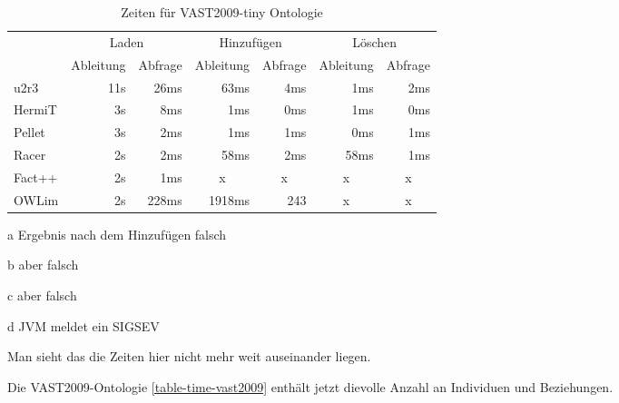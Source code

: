 \begin{table}[htbp]
\caption{Zeiten für VAST2009-tiny Ontologie}
\label{table-time-vast-tiny}
\begin{center}
\begin{threeparttable}
\begin{tabular}{l|r|r|r|r|r|r|}
\cline{2-7}
 & \multicolumn{2}{|c|}{Laden} & \multicolumn{2}{|c|}{Hinzufügen} & \multicolumn{2}{|c|}{Löschen} \\
\cline{2-7}
 & \multicolumn{1}{|c|}{Ableitung} & \multicolumn{1}{|c|}{Abfrage} & \multicolumn{1}{|c|}{Ableitung} & \multicolumn{1}{|c|}{Abfrage} & \multicolumn{1}{|c|}{Ableitung} & \multicolumn{1}{|c|}{Abfrage} \\
\hline
\multicolumn{1}{|l|}{u2r3} & 11s & 26ms & 63ms & 4ms & 1ms & 2ms \\ \hline
\multicolumn{1}{|l|}{HermiT\tnote{a}} & 3s & 8ms & 1ms & 0ms & 1ms & 0ms \\ \hline
\multicolumn{1}{|l|}{Pellet\tnote{b}} & 3s & 2ms & 1ms & 1ms & 0ms & 1ms \\ \hline
\multicolumn{1}{|l|}{Racer\tnote{c}} & 2s & 2ms & 58ms & 2ms & 58ms & 1ms \\ \hline
\multicolumn{1}{|l|}{Fact++\tnote{d}} & 2s & 1ms & \multicolumn{1}{c|}{x} & \multicolumn{1}{c|}{x} & \multicolumn{1}{c|}{x} & \multicolumn{1}{c|}{x} \\ \hline
\multicolumn{1}{|l|}{OWLim} & 2s & 228ms & 1918ms & 243 & \multicolumn{1}{c|}{x} & \multicolumn{1}{c|}{x} \\ \hline
\end{tabular}
\begin{tablenotes}
	\item[a] Ergebnis nach dem Hinzufügen falsch
	\item[b] aber falsch
	\item[c] aber falsch
	\item[d] JVM meldet ein SIGSEV
\end{tablenotes}
\end{threeparttable}
\end{center}
\end{table}

Man sieht das die Zeiten hier nicht mehr weit auseinander liegen.

Die VAST2009-Ontologie \ref{table-time-vast2009} enthält jetzt dievolle Anzahl an Individuen und Beziehungen.

